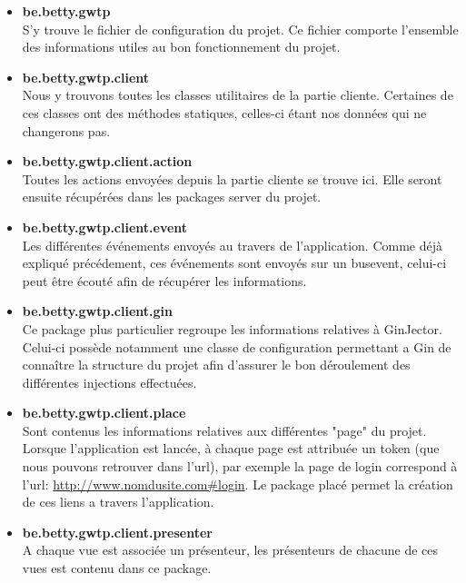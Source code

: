 \begin{itemize}
\item \textbf{be.betty.gwtp}\\
	S'y trouve le fichier de configuration du projet. Ce fichier comporte l'ensemble des informations utiles au bon fonctionnement du projet.\\
	
\item \textbf{be.betty.gwtp.client}\\
	Nous y trouvons toutes les classes utilitaires de la partie cliente. Certaines de ces classes ont des méthodes statiques, celles-ci étant nos données qui ne changerons pas.\\
	
\item \textbf{be.betty.gwtp.client.action}\\
	Toutes les actions envoyées depuis la partie cliente se trouve ici. Elle seront ensuite récupérées dans les packages server du projet.\\
	
\item \textbf{be.betty.gwtp.client.event}\\
	Les différentes événements envoyés au travers de l'application. Comme déjà expliqué précédement, ces événements sont envoyés sur un busevent, celui-ci peut être écouté afin de récupérer les informations.\\
	
\item \textbf{be.betty.gwtp.client.gin}\\
	Ce package plus particulier regroupe les informations relatives à GinJector. Celui-ci possède notamment une classe de configuration permettant a Gin de connaître la structure du projet afin d'assurer le bon déroulement des différentes injections effectuées.\\
	
\item \textbf{be.betty.gwtp.client.place}\\
Sont contenus les informations relatives aux différentes "page" du projet. Lorsque l'application est lancée, à chaque page est attribuée un token (que nous pouvons retrouver dans l'url), par exemple la page de login correspond à l'url: \url{http://www.nomdusite.com\#login}. Le package placé permet la création de ces liens a travers l'application.\\

\item \textbf{be.betty.gwtp.client.presenter}\\
A chaque vue est associée un présenteur, les présenteurs de chacune de ces vues est contenu dans ce package.\\


\end{itemize}
